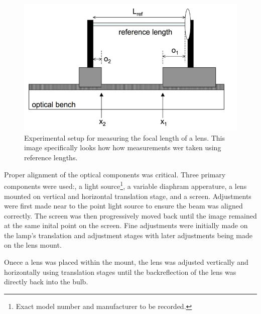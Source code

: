 \documentclass[aip, cp, amsmath, amssymb, reprint, nofootinbib]{revtex4-2}
\begin{document}
        \begin{figure}[H]
            \centering
            \includegraphics[width=0.8\linewidth]{figures/optical-bench.png}
            \caption{Experimental setup for measuring the focal length of a lens. This image specifically looks how how measurements wer taken using reference lengths.}
            \label{fig:expsetup}
        \end{figure}

        Proper alignment of the optical components was critical. Three primary components were used:, a light source\footnote{Exact model number and manufacturer to be recorded.}, a variable diaphram apperature, a lens mounted on vertical and horizontal translation stage, and a screen. Adjustments were first made near to the point light source to ensure the beam was aligned correctly. The screen was then progressively moved back until the image remained at the same inital point on the screen. Fine adjustments were initially made on the lamp's translation and adjustment stages with later adjustments being made on the lens mount.

        Onece a lens was placed within the mount, the lens was adjusted vertically and horizontally using translation stages until the backreflection of the lens was directly back into the bulb.
\end{document}
